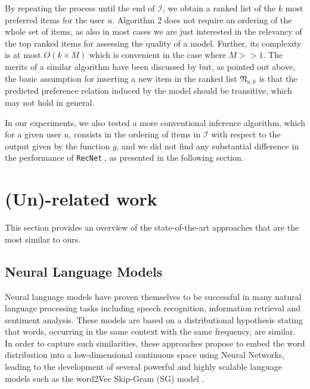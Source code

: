 \documentclass[10pt,journal,compsoc]{IEEEtran}
\newcommand{\RecNet}{\texttt{RecNet}}
\begin{document}
\begin{sloppypar}
\medskip

By repeating the process until the end of $\mathcal I$, we obtain a ranked list of the $k$ most preferred items for the user $u$. Algorithm 2 does not require an ordering of the whole set of items, as also in most cases we are just interested in the relevancy of the top ranked items for assessing the quality of a model. Further, its complexity is at most $O(k\times M)$ which is convenient in the case where $M>\!\!>\! 1$. The merits of a similar algorithm have been discussed by \cite{Ailon08anefficient} but, as pointed out above, the basic assumption for inserting a new item in the ranked list $\mathfrak N_{u,k}$ is that the predicted preference relation induced by the model should be transitive, which may not hold in general.

\smallskip

In our experiments, we also tested a more conventional inference algorithm, which for a given user $u$, consists in the ordering of items in $\mathcal I$ with respect to the output given by the function $g$, and we did not find any substantial difference in the performance of {\RecNet}$_.$, as presented in the following section.

\section{(Un)-related work}\label{sec:sim}

This section provides an overview of the state-of-the-art approaches that are the most similar to ours.

\subsection{Neural Language Models}
Neural language models have proven themselves to be successful in many natural language processing tasks including speech recognition, information retrieval and sentiment analysis. These models are based on a distributional hypothesis stating that words, occurring in the same context with the same frequency, are similar. In order to capture such similarities, these approaches propose to embed the word distribution into a low-dimensional continuous space using Neural Networks, leading to the development of several powerful and highly scalable language models such as the word2Vec Skip-Gram (SG) model \cite{word_emb,mikolov_13}.


\medskip


\end{sloppypar}
\end{document}
